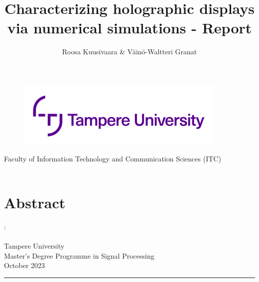 \documentclass[12pt,a4paper,english
]{tunithesis}
\author{Roosa Kuusivaara \& Väinö-Waltteri Granat}
\title{Characterizing holographic displays via
numerical simulations - Report} %
\begin{document}
\makeatletter

\thispagestyle{empty}
\vspace*{-.5cm}\noindent

\begin{figure}
    \vspace{-1.3cm}
    \advance\leftskip-2.5cm
    \noindent\includegraphics{img/tunilogo.png}
\end{figure}
 
\vspace{2.5cm}
\begin{flushright}
\noindent\textsf{\LARGE{\@author}}

\noindent\vspace{0.5cm}

\noindent\Huge{\textsf{\textbf{\textcolor{tunipurple}{\@title}}}}
\end{flushright}
\vspace{13.7cm} %

\begin{flushright}  
    \begin{spacing}{1.0}
      \textsf{Faculty of Information Technology and Communication Sciences (ITC)\\
      \@thesistype\\}
    \end{spacing}
\end{flushright}

\if@twoside
\clearpage
\fi



\chapter*{Abstract}
\begin{spacing}{1.0}
\noindent \@author: \@title\\
\@thesistype\\
Tampere University\\
Master’s Degree Programme in Signal Processing\\
October 2023 \\
\end{spacing}
\noindent\rule{12cm}{0.4pt}
\end{document}
